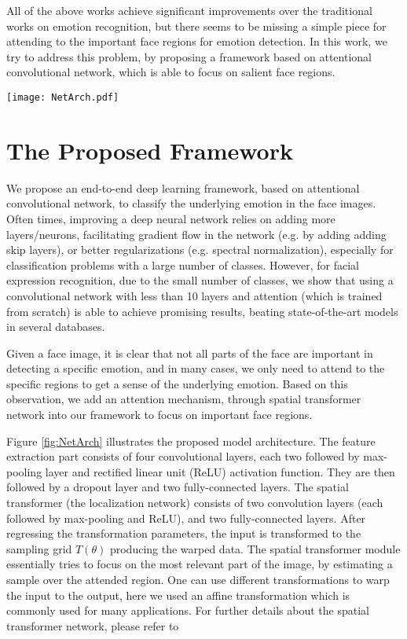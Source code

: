 \documentclass[conference]{IEEEtran}
\begin{document}
All of the above works achieve significant improvements over the traditional works on emotion recognition, but there seems to be missing a simple piece for attending to the important face regions for emotion detection. 
In this work, we try to address this problem, by proposing a framework based on attentional convolutional network, which is able to focus on salient face regions.




\begin{figure*}[t]
\begin{center}
   \texttt{[image: NetArch.pdf]}
\end{center}
   \caption{The proposed model architecture}
\label{fig:NetArch}
\end{figure*}




\section{The Proposed Framework}
We propose an end-to-end deep learning framework, based on attentional convolutional network, to classify the underlying emotion in the face images.
Often times, improving a deep neural network relies on adding more layers/neurons, facilitating gradient flow in the network (e.g. by adding adding skip layers), or better regularizations (e.g. spectral normalization), especially for classification problems with a large number of classes.
However, for facial expression recognition, due to the small number of classes, we show that using a convolutional network with less than 10 layers and attention (which is trained from scratch) is able to achieve promising results, beating state-of-the-art models in several databases.

Given a face image, it is clear that not all parts of the face are important in detecting a specific emotion, and in many cases, we only need to attend to the specific regions to get a sense of the underlying emotion.
Based on this observation, we add an attention mechanism, through spatial transformer network into our framework to focus on important face regions. 

Figure \ref{fig:NetArch} illustrates the proposed model architecture.
The feature extraction part consists of four convolutional layers, each two followed by max-pooling layer and rectified linear unit (ReLU) activation function. 
They are then followed by a dropout layer and two fully-connected layers.
The spatial transformer (the localization network) consists of two convolution layers (each followed by max-pooling and ReLU), and two fully-connected layers.
After regressing the transformation parameters, the input is transformed to the sampling grid $T(\theta)$ producing the warped data.
The spatial transformer module essentially tries to focus on the most relevant part of the image, by estimating a sample over the attended region. One can use different transformations to warp the input to the output, here we used an affine transformation which is commonly used for many applications.
For further details about the spatial transformer network, please refer to \cite{STN}
\end{document}
